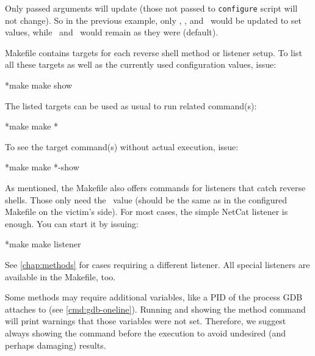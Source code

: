 Only passed arguments will update (those not passed to \texttt{configure} script will not change). So in the previous example, only \host, \port, and \tmp\ would be updated to set values, while \shell\ and \portt\ would remain as they were (default).

Makefile contains targets for each reverse shell method or listener setup. To list all these targets as well as the currently used configuration values, issue:

\begin{cmdline}{*}{make}{}
make show
\end{cmdline}

The listed targets can be used as usual to run related command(s):

\begin{cmdline}{*}{make}{}
make *\target*
\end{cmdline}

To see the target command(s) without actual execution, issue:

\begin{cmdline}{*}{make}{}
make *\target*-show
\end{cmdline}

As mentioned, the Makefile also offers commands for listeners that catch reverse shells. Those only need the \port\ value (should be the same as in the configured Makefile on the victim's side). For most cases, the simple NetCat listener is enough. You can start it by issuing:

\begin{cmdline}{*}{make}{}
make listener
\end{cmdline}

See \cref{chap:methods} for cases requiring a different listener. All special listeners are available in the Makefile, too.

Some methods may require additional variables, like a PID of the process GDB attaches to (see \cref{cmd:gdb-oneline}). Running and showing the method command will print warnings that those variables were not set. Therefore, we suggest always showing the command before the execution to avoid undesired (and perhaps damaging) results.

